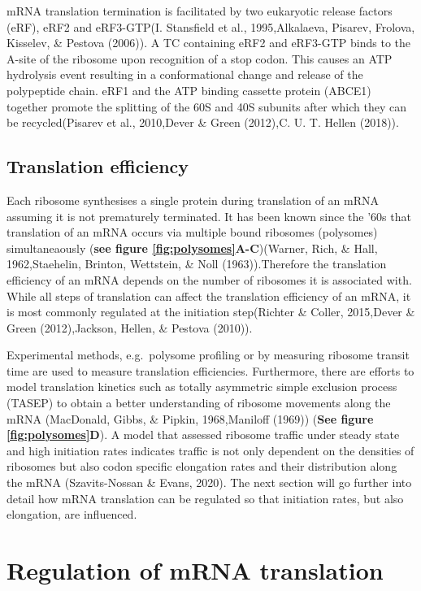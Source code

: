 \documentclass[12pt,openany]{book}
\begin{document}
mRNA translation termination is facilitated by two eukaryotic release
factors (eRF), eRF2 and eRF3-GTP(I. Stansfield et al., 1995,Alkalaeva,
Pisarev, Frolova, Kisselev, \& Pestova (2006)). A TC containing eRF2 and
eRF3-GTP binds to the A-site of the ribosome upon recognition of a stop
codon. This causes an ATP hydrolysis event resulting in a conformational
change and release of the polypeptide chain. eRF1 and the ATP binding
cassette protein (ABCE1) together promote the splitting of the 60S and
40S subunits after which they can be recycled(Pisarev et al., 2010,Dever
\& Green (2012),C. U. T. Hellen (2018)).

\subsection{Translation efficiency}

Each ribosome synthesises a single protein during translation of an mRNA
assuming it is not prematurely terminated. It has been known since the
'60s that translation of an mRNA occurs via multiple bound ribosomes
(polysomes) simultaneaously (\textbf{see figure
\ref{fig:polysomes}A-C})(Warner, Rich, \& Hall, 1962,Staehelin, Brinton,
Wettstein, \& Noll (1963)).Therefore the translation efficiency of an
mRNA depends on the number of ribosomes it is associated with. While all
steps of translation can affect the translation efficiency of an mRNA,
it is most commonly regulated at the initiation step(Richter \& Coller,
2015,Dever \& Green (2012),Jackson, Hellen, \& Pestova (2010)).

Experimental methods, e.g.~polysome profiling or by measuring ribosome
transit time are used to measure translation efficiencies. Furthermore,
there are efforts to model translation kinetics such as totally
asymmetric simple exclusion process (TASEP) to obtain a better
understanding of ribosome movements along the mRNA (MacDonald, Gibbs, \&
Pipkin, 1968,Maniloff (1969)) (\textbf{See figure
\ref{fig:polysomes}D}). A model that assessed ribosome traffic under
steady state and high initiation rates indicates traffic is not only
dependent on the densities of ribosomes but also codon specific
elongation rates and their distribution along the mRNA (Szavits-Nossan
\& Evans, 2020). The next section will go further into detail how mRNA
translation can be regulated so that initiation rates, but also
elongation, are influenced.

\section{Regulation of mRNA translation} \label{regmRNA}
\end{document}
